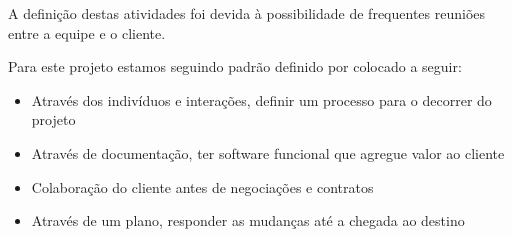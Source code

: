 A definição destas atividades foi devida à possibilidade de frequentes reuniões entre a equipe e o cliente. 

Para este projeto estamos seguindo padrão definido por \cite{cho2009hybrid} colocado a seguir:

\begin{itemize}
    \item{Através dos indivíduos e interações, definir um processo para o decorrer do projeto}
    \item{Através de documentação, ter software funcional que agregue valor ao cliente}
    \item{Colaboração do cliente antes de negociações e contratos}
    \item{Através de um plano, responder as mudanças até a chegada ao destino}
\end{itemize}
